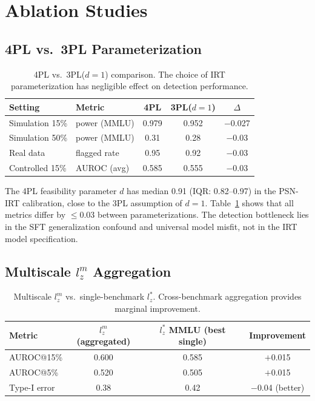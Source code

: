 \documentclass[11pt]{article}
\begin{document}
\section{Ablation Studies}

\subsection{4PL vs.\ 3PL Parameterization}

\begin{table}[t]
\centering
\caption{4PL vs.\ 3PL($d{=}1$) comparison. The choice of IRT parameterization has negligible effect on detection performance.}
\label{tab:4pl-3pl}
\begin{tabular}{llccc}
\toprule
Setting & Metric & 4PL & 3PL($d{=}1$) & $\Delta$ \\
\midrule
Simulation 15\% & power (MMLU) & 0.979 & 0.952 & $-$0.027 \\
Simulation 50\% & power (MMLU) & 0.31  & 0.28  & $-$0.03 \\
Real data       & flagged rate & 0.95  & 0.92  & $-$0.03 \\
Controlled 15\% & AUROC (avg)  & 0.585 & 0.555 & $-$0.03 \\
\bottomrule
\end{tabular}
\end{table}

The 4PL feasibility parameter $d$ has median 0.91 (IQR: 0.82--0.97) in the PSN-IRT calibration, close to the 3PL assumption of $d = 1$.
Table~\ref{tab:4pl-3pl} shows that all metrics differ by $\leq 0.03$ between parameterizations.
The detection bottleneck lies in the SFT generalization confound and universal model misfit, not in the IRT model specification.

\subsection{Multiscale $l_z^m$ Aggregation}

\begin{table}[t]
\centering
\caption{Multiscale $l_z^m$ vs.\ single-benchmark $l_z^*$. Cross-benchmark aggregation provides marginal improvement.}
\label{tab:lzm}
\begin{tabular}{lccc}
\toprule
Metric & $l_z^m$ (aggregated) & $l_z^*$ MMLU (best single) & Improvement \\
\midrule
AUROC@15\%  & 0.600 & 0.585 & $+$0.015 \\
AUROC@5\%   & 0.520 & 0.505 & $+$0.015 \\
Type-I error & 0.38  & 0.42  & $-$0.04 (better) \\
\bottomrule
\end{tabular}
\end{table}
\end{document}
